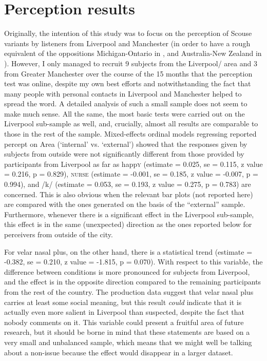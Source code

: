 \chapter{Perception results}
\label{ch.perc_res}
\largerpage
Originally, the intention of this study was to focus on the perception of Scouse variants by listeners from Liverpool and Manchester (in order to have a rough equivalent of the oppositions Michigan-Ontario in \citealt{niedzielski1999}, and Australia-New Zealand in \citealt{hayetal2006a}).
However, I only managed to recruit 9 subjects from the Liverpool/ area and 3 from Greater Manchester over the course of the 15 months that the perception test was online, despite my own best efforts and notwithstanding the fact that many people with personal contacts in Liverpool and Manchester helped to spread the word.
A detailed analysis of such a small sample does not seem to make much sense.
All the same, the most basic tests were carried out on the Liverpool sub-sample as well, and, crucially, almost all results are comparable to those in the rest of the sample.
Mixed-effects ordinal models regressing reported percept on Area (\enquote*{internal} vs. \enquote*{external}) showed that the responses given by subjects from outside were not significantly different from those provided by participants from Liverpool as far as happ\textsc{y} (estimate = 0.025, se = 0.115, z value = 0.216, p = 0.829), \textsc{nurse} (estimate = -0.001, se = 0.185, z value = -0.007, p = 0.994), and /k/ (estimate = 0.053, se = 0.193, z value = 0.275, p = 0.783) are concerned.
This is also obvious when the relevant bar plots (not reported here) are compared with the ones generated on the basis of the ``external'' sample.
Furthermore, whenever there is a significant  effect in the Liverpool sub-sample, this effect is in the same (unexpected) direction as the ones reported below for perceivers from outside of the city.

For velar nasal plus, on the other hand, there is a statistical trend (estimate = -0.382, se = 0.210, z value = -1.815, p = 0.070).
With respect to this variable, the difference between  conditions is more pronounced for subjects from Liverpool, and the effect is in the opposite direction compared to the remaining participants from the rest of the country.
The production data suggest that velar nasal plus carries at least some social meaning, but this result \emph{could} indicate that it is actually even more salient in Liverpool than suspected, despite the fact that nobody comments on it.
This variable could present a fruitful area of future research, but it should be borne in mind that these statements are based on a very small and unbalanced sample, which means that we might well be talking about a non-issue because the effect would disappear in a larger dataset.

